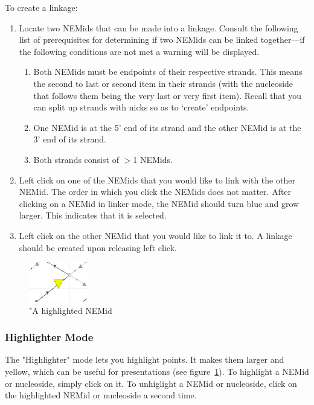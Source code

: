 \documentclass[titlepage]{article}
\begin{document}
To create a linkage:
\begin{enumerate}
	\item Locate two NEMids that can be made into a linkage. Consult the following list of prerequisites for determining if two NEMids can be linked together---if the following conditions are not met a warning will be displayed.
	\begin{enumerate}
		\item Both NEMids must be endpoints of their respective strands. This means the second to last or second item in their strands (with the nucleoside that follows them being the very last or very first item). Recall that you can split up strands with nicks so as to `create' endpoints.
		\item One NEMid is at the 5' end of its strand and the other NEMid is at the 3' end of its strand.
		\item Both strands consist of $>$1 NEMids.
	\end{enumerate}

	\item Left click on one of the NEMids that you would like to link with the other NEMid. The order in which you click the NEMids does not matter. After clicking on a NEMid in linker mode, the NEMid should turn blue and grow larger. This indicates that it is selected.
	
	\item Left click on the other NEMid that you would like to link it to. A linkage should be created upon releasing left click.
\end{enumerate}

\begin{figure} \label{fig:highlighted-NEMid}
	\centering
	\includegraphics[width=1in]{highlighted-nemid.png}
	\caption{"A highlighted NEMid}
\end{figure}

\subsubsection{Highlighter Mode}

The "Highlighter" mode lets you highlight points. It makes them larger and yellow, which can be useful for presentations (see figure~\ref{fig:highlighted-NEMid}). 
To highlight a NEMid or nucleoside, simply click on it. To unhiglight a NEMid or nucleoside, click on the highlighted NEMid or nucleoside a second time.
\end{document}
